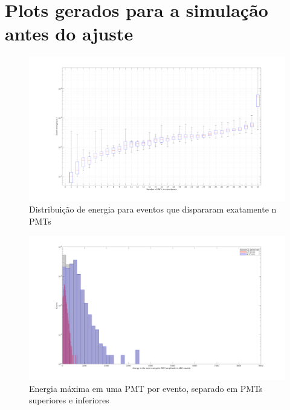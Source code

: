 \chapter{Plots gerados para a simulação antes do ajuste}\label{apdx:simantesantes}

\begin{figure}[H]
	\centering
	\includegraphics[width=16cm]{postextuais/apendice/simantes/boxplot.png}
	\caption{Distribuição de energia para eventos que dispararam exatamente n PMTs }
	\label{fig:transf}
\end{figure}

\begin{figure}[H]
	\centering
	\includegraphics[width=16cm]{postextuais/apendice/simantes/energ_max_adc.png}
	\caption{Energia máxima em uma PMT por evento, separado em PMTs superiores e inferiores }
	\label{fig:transf}
\end{figure}

